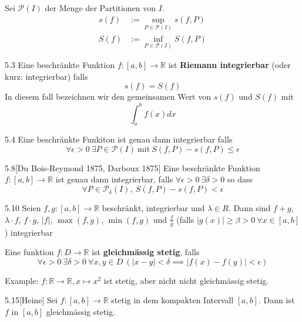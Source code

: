 \documentclass[8pt,a4paper,twocolumn,table]{extarticle}
\newcommand{\R}{\mathbb{R}}
\begin{document}
\begin{definition}{}
    Sei $\mathcal{P}(I)$ der Menge der Partitionen von $I$.
    \begin{align*}
        s(f) & := \sup_{P \in \mathcal{P}(I)} s(f, P) \\
        S(f) & := \inf_{P \in \mathcal{P}(I)} S(f, P)
    \end{align*}
\end{definition}

\begin{satz}{5.3}
    Eine beschränkte Funktion $f: [a,b] \to \R$ ist \textbf{Riemann integrierbar} (oder kurz: integrierbar) falls
    \[ s(f) = S(f) \]
    In diesem fall bezeichnen wir den gemeinsamen Wert von $s(f)$ und $S(f)$ mit
    \[ \int_a^b f(x) dx \]
\end{satz}

\begin{satz}{5.4}
    Eine beschränkte Funkiton ist genau dann integrierbar falls
    \[ \forall \epsilon > 0\ \exists P \in \mathcal{P}(I)\ \mbox{mit}\ S(f, P) - s(f, P) \le \epsilon \]
\end{satz}

\begin{satz}{5.8}[Du Bois-Reymond 1875, Darboux 1875]
    Eine beschränkte Funktion $f: [a, b] \to \R$ ist genau dann integrierbar, falls $\forall \epsilon > 0\ \exists \delta > 0$
    so dass
    \[ \forall P \in \mathcal{P}_\delta(I),\ S(f, P) - s(f, P) < \epsilon \]
\end{satz}

\begin{satz}{5.10}
    Seien $f, g: [a, b] \to \R$ beschränkt, integrierbar und $\lambda \in R$. Dann sind $f + g$, $\lambda \cdot f$, $f \cdot g$, $|f|$,
    $\max(f, g)$, $\min(f, g)$ und $\frac{f}{g}$ (falls $|g(x)| \ge \beta > 0\ \forall x \in [a, b]$) integrierbar
\end{satz}

\begin{definition}
    Eine funktion $f: D \to \R$ ist \textbf{gleichmässig stetig}, falls
    \[ \forall \epsilon > 0\ \exists \delta > 0\ \forall x,y \in D\ \left( |x - y| < \delta \implies |f(x) - f(y)| < \epsilon \right) \]

    Example: $f: \R \to \R, x \mapsto x^2$ ist stetig, aber nicht nicht gleichmässig stetig.
\end{definition}

\begin{satz}{5.15}[Heine]
    Sei $f: [a,b] \to \R$ stetig in dem kompakten Intervall $[a,b]$. Dann ist $f$ in $[a,b]$ gleichmässig stetig.
\end{satz}
\end{document}
